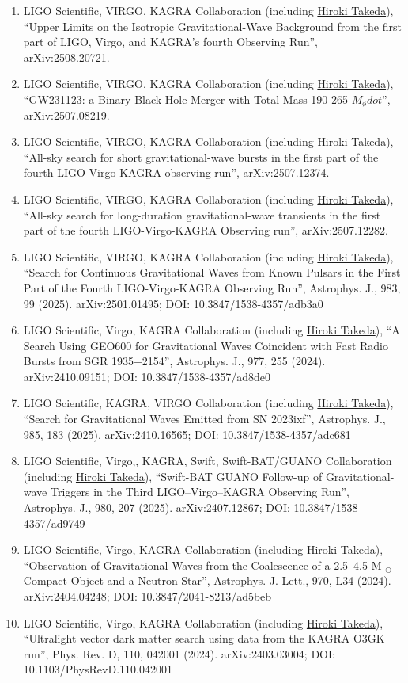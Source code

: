 \documentclass[uplatex, 11pt]{jsarticle}
\begin{document}
\begin{enumerate}
\item LIGO Scientific, VIRGO, KAGRA Collaboration (including \uline{Hiroki Takeda}), “Upper Limits on the Isotropic Gravitational-Wave Background from the first part of LIGO, Virgo, and KAGRA's fourth Observing Run”, arXiv:2508.20721.
\item LIGO Scientific, VIRGO, KAGRA Collaboration (including \uline{Hiroki Takeda}), “GW231123: a Binary Black Hole Merger with Total Mass 190-265 $M_ødot$”, arXiv:2507.08219.
\item LIGO Scientific, VIRGO, KAGRA Collaboration (including \uline{Hiroki Takeda}), “All-sky search for short gravitational-wave bursts in the first part of the fourth LIGO-Virgo-KAGRA observing run”, arXiv:2507.12374.
\item LIGO Scientific, VIRGO, KAGRA Collaboration (including \uline{Hiroki Takeda}), “All-sky search for long-duration gravitational-wave transients in the first part of the fourth LIGO-Virgo-KAGRA Observing run”, arXiv:2507.12282.
\item LIGO Scientific, VIRGO, KAGRA Collaboration (including \uline{Hiroki Takeda}), “Search for Continuous Gravitational Waves from Known Pulsars in the First Part of the Fourth LIGO-Virgo-KAGRA Observing Run”, Astrophys. J., 983, 99 (2025). arXiv:2501.01495; DOI: 10.3847/1538-4357/adb3a0
\item LIGO Scientific, Virgo, KAGRA Collaboration (including \uline{Hiroki Takeda}), “A Search Using GEO600 for Gravitational Waves Coincident with Fast Radio Bursts from SGR 1935+2154”, Astrophys. J., 977, 255 (2024). arXiv:2410.09151; DOI: 10.3847/1538-4357/ad8de0
\item LIGO Scientific, KAGRA, VIRGO Collaboration (including \uline{Hiroki Takeda}), “Search for Gravitational Waves Emitted from SN 2023ixf”, Astrophys. J., 985, 183 (2025). arXiv:2410.16565; DOI: 10.3847/1538-4357/adc681
\item LIGO Scientific, Virgo,, KAGRA, Swift, Swift-BAT/GUANO Collaboration (including \uline{Hiroki Takeda}), “Swift-BAT GUANO Follow-up of Gravitational-wave Triggers in the Third LIGO–Virgo–KAGRA Observing Run”, Astrophys. J., 980, 207 (2025). arXiv:2407.12867; DOI: 10.3847/1538-4357/ad9749
\item LIGO Scientific, Virgo, KAGRA Collaboration (including \uline{Hiroki Takeda}), “Observation of Gravitational Waves from the Coalescence of a 2.5–4.5 M $_⊙$ Compact Object and a Neutron Star”, Astrophys. J. Lett., 970, L34 (2024). arXiv:2404.04248; DOI: 10.3847/2041-8213/ad5beb
\item LIGO Scientific, Virgo, KAGRA Collaboration (including \uline{Hiroki Takeda}), “Ultralight vector dark matter search using data from the KAGRA O3GK run”, Phys. Rev. D, 110, 042001 (2024). arXiv:2403.03004; DOI: 10.1103/PhysRevD.110.042001

\end{enumerate}
\end{document}
